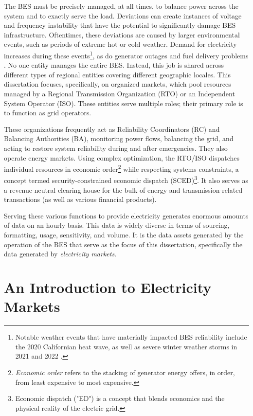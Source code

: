 The BES must be precisely managed, at all times, to balance power across the system and to exactly serve the load. Deviations can create instances of voltage and frequency instability that have the potential to significantly damage BES infrastructure. Oftentimes, these deviations are caused by larger environmental events, such as periods of extreme hot or cold weather. Demand for electricity increases during these events\footnote{Notable weather events that have materially impacted BES reliability include the 2020 Californian heat wave, as well as severe winter weather storms in 2021 and 2022 \cite{balancing2}.}, as do generator outages and fuel delivery problems \cite{balancing1}.
No one entity manages the entire BES. Instead, this job is shared across different types of regional entities covering different geographic locales. This dissertation focuses, specifically, on organized markets, which pool resources managed by a Regional Transmission Organization (RTO) or an Independent System Operator (ISO). These entities serve multiple roles; their primary role is to function as grid operators. 

These organizations frequently act as Reliability Coordinators (RC) and Balancing Authorities (BA), monitoring power flows, balancing the grid, and acting to restore system reliability during and after emergencies. They also operate energy markets. Using complex optimization, the RTO/ISO dispatches individual resources in economic order\footnote{\textit{Economic order} refers to the stacking of generator energy offers, in order, from least expensive to most expensive.} while respecting systems constraints, a concept termed security-constrained economic dispatch (SCED)\footnote{Economic dispatch ("ED") is a concept that blends economics and the physical reality of the electric grid.}. It also serves as a revenue-neutral clearing house for the bulk of energy and transmission-related transactions (as well as various financial products).

Serving these various functions to provide electricity generates enormous amounts of data on an hourly basis. This data is widely diverse in terms of sourcing, formatting, usage, sensitivity, and volume. It is the data assets generated by the operation of the BES that serve as the focus of this dissertation, specifically the data generated by \textit{electricity markets}.

\section{An Introduction to Electricity Markets}

